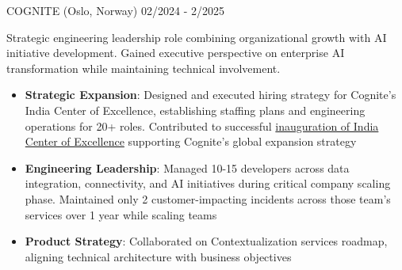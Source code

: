 \documentclass[singlesided,
               paper=a4,
               fontsize=10pt
              ]{my-resume}
\begin{document}
%    
	{COGNITE (Oslo, Norway)}
    {02/2024 - 2/2025}
    {
        Strategic engineering leadership role combining organizational growth with AI initiative development. Gained executive perspective on enterprise AI transformation while maintaining technical involvement.

        \begin{itemize}[leftmargin=2em]
            \item \textbf{Strategic Expansion}: Designed and executed hiring strategy for Cognite's India Center of Excellence, establishing staffing plans and engineering operations for 20+ roles. Contributed to successful \href{https://www.cognite.com/en/company/newsroom/cognite-inaugurates-india-center-of-excellence-in-bengaluru-with-commitment-to-leveraging-ai-for-industrial-growth}{inauguration of India Center of Excellence} supporting Cognite's global expansion strategy
            \item \textbf{Engineering Leadership}: Managed 10-15 developers across data integration, connectivity, and AI initiatives during critical company scaling phase. Maintained only 2 customer-impacting incidents across those team's services over 1 year while scaling teams
            \item \textbf{Product Strategy}: Collaborated on Contextualization services roadmap, aligning technical architecture with business objectives
        \end{itemize}
    }

\clearpage
\pagestyle{empty}
\end{document}
